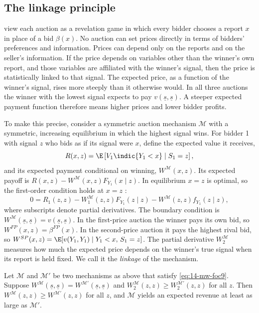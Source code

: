 \subsection{The linkage principle}\label{sec:14-linkage}

\citet[pp.~1110--1111]{MilgromWeber1982} view each auction as a revelation game in which every bidder chooses a
report $x$ in place of a bid $\beta(x)$. No auction can set prices directly in terms of bidders' preferences
and information. Prices can depend only on the reports and on the seller's information. If the price depends
on variables other than the winner's own report, and those variables are affiliated with the winner's signal,
then the price is statistically linked to that signal. The expected price, as a function of the winner's
signal, rises more steeply than it otherwise would. In all three auctions the winner with the lowest signal
expects to pay $v(\underline s,\underline s)$. A steeper expected payment function therefore means higher
prices and lower bidder profits.

To make this precise, consider a symmetric auction mechanism $\mathcal M$ with a symmetric, increasing
equilibrium in which the highest signal wins. For bidder 1 with signal $z$ who bids as if its signal were $x$,
define the expected value it receives,
\begin{equation*}
  R(x,z)=\E\left[V_1\indic\{Y_1<x\}\mid S_1=z\right],
\end{equation*}
and its expected payment conditional on winning, $W^{\mathcal M}(x,z)$. Its expected payoff is
$R(x,z)-W^{\mathcal M}(x,z)F_{Y_1}(x\mid z)$. In equilibrium $x=z$ is optimal, so the first-order condition
holds at $x=z$ \citep[eq.~(9)]{MilgromWeber1982}:
\begin{equation}\label{eq:14-mw-foc9}
  0=R_1(z,z)-W^{\mathcal M}_1(z,z)F_{Y_1}(z\mid z)-W^{\mathcal M}(z,z)f_{Y_1}(z\mid z),
\end{equation}
where subscripts denote partial derivatives. The boundary condition is
$W^{\mathcal M}(\underline s,\underline s)=v(\underline s,\underline s)$. In the first-price auction the
winner pays its own bid, so $W^{FP}(x,z)=\beta^{FP}(x)$. In the second-price auction it pays the highest rival
bid, so $W^{SP}(x,z)=\E[v(Y_1,Y_1)\mid Y_1<x,\,S_1=z]$. The partial derivative $W_2^{\mathcal M}$ measures how
much the expected price depends on the winner's true signal when its report is held fixed. We call it the
\emph{linkage} of the mechanism.

\begin{proposition}\label{prop:14-linkage}
Let $\mathcal M$ and $\mathcal M'$ be two mechanisms as above that satisfy \eqref{eq:14-mw-foc9}. Suppose
$W^{\mathcal M}(\underline s,\underline s)=W^{\mathcal M'}(\underline s,\underline s)$ and
$W^{\mathcal M}_2(z,z)\ge W^{\mathcal M'}_2(z,z)$ for all $z$. Then $W^{\mathcal M}(z,z)\ge W^{\mathcal
M'}(z,z)$ for all $z$, and $\mathcal M$ yields an expected revenue at least as large as $\mathcal M'$.
\end{proposition}

